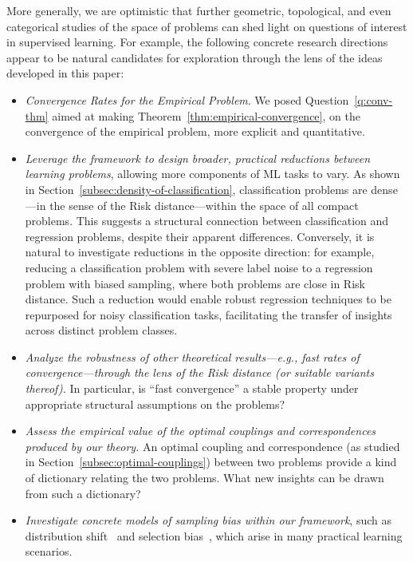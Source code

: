 \documentclass[twoside,11pt]{article}
\begin{document}
 More generally, we are optimistic that further geometric, topological, and even categorical studies of the space of problems can shed light on questions of interest in supervised learning. For example, the following concrete research directions appear to be natural candidates for exploration through the lens of the ideas developed in this paper:\begin{itemize}
\item \emph{Convergence Rates for the Empirical Problem}. We posed Question~\ref{q:conv-thm} aimed at making Theorem~\ref{thm:empirical-convergence}, on the convergence of the empirical problem, more explicit and quantitative.
\item \emph{Leverage the framework to design broader, practical reductions between learning problems}, allowing more components of ML tasks to vary. As shown in Section~\ref{subsec:density-of-classification}, classification problems are dense—in the sense of the Risk distance—within the space of all compact problems. This suggests a structural connection between classification and regression problems, despite their apparent differences. Conversely, it is natural to investigate reductions in the opposite direction: for example, reducing a classification problem with severe label noise to a regression problem with biased sampling, where both problems are close in Risk distance. Such a reduction would enable robust regression techniques to be repurposed for noisy classification tasks, facilitating the transfer of insights across distinct problem classes.
\item \emph{Analyze the robustness of other theoretical results—e.g., fast rates of convergence—through the lens of the Risk distance (or suitable variants thereof)}. In particular, is “fast convergence” a stable property under appropriate structural assumptions on the problems?
\item \emph{Assess the empirical value of the optimal couplings and correspondences produced by our theory.} An optimal coupling and correspondence (as studied in Section~\ref{subsec:optimal-couplings}) between two problems provide a kind of dictionary relating the two problems. What new insights can be drawn from such a dictionary?
\item \emph{Investigate concrete models of \emph{sampling bias} within our framework}, such as distribution shift~\citep{quinonero-candela_2009_dataset} and selection bias~\citep{meng2018statistical}, which arise in many practical learning scenarios. 
\end{itemize}
\end{document}
